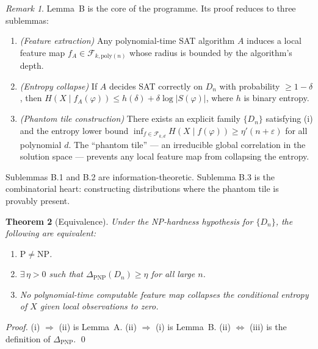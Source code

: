 \documentclass[11pt]{article}
\newtheorem{theorem}{Theorem}[section]
\theoremstyle{definition}
\theoremstyle{remark}
\newtheorem{remark}[theorem]{Remark}
\begin{document}
\begin{remark}
Lemma~B is the core of the programme. Its proof reduces to three sublemmas:
\begin{enumerate}
  \item[\textbf{B.1}] \emph{(Feature extraction)} Any polynomial-time SAT algorithm $A$ induces a local feature map $f_A \in \mathcal{F}_{k, \mathrm{poly}(n)}$ whose radius is bounded by the algorithm's depth.
  \item[\textbf{B.2}] \emph{(Entropy collapse)} If $A$ decides SAT correctly on $D_n$ with probability $\geq 1 - \delta$, then $H(X \mid f_A(\varphi)) \leq h(\delta) + \delta \log |S(\varphi)|$, where $h$ is binary entropy.
  \item[\textbf{B.3}] \emph{(Phantom tile construction)} There exists an explicit family $\{D_n\}$ satisfying (i) and the entropy lower bound $\inf_{f \in \mathcal{F}_{k,d}} H(X \mid f(\varphi)) \geq \eta'(n + \varepsilon)$ for all polynomial $d$. The ``phantom tile'' --- an irreducible global correlation in the solution space --- prevents any local feature map from collapsing the entropy.
\end{enumerate}
Sublemmas B.1 and B.2 are information-theoretic. Sublemma B.3 is the combinatorial heart: constructing distributions where the phantom tile is provably present.
\end{remark}

\begin{theorem}[Equivalence]
\label{thm:pnp-equiv}
Under the NP-hardness hypothesis for $\{D_n\}$, the following are equivalent:
\begin{enumerate}
  \item[(i)] $\mathrm{P} \neq \mathrm{NP}$.
  \item[(ii)] $\exists\, \eta > 0$ such that $\Delta_{\mathrm{PNP}}(D_n) \geq \eta$ for all large $n$.
  \item[(iii)] No polynomial-time computable feature map collapses the conditional entropy of $X$ given local observations to zero.
\end{enumerate}
\end{theorem}

\begin{proof}
(i) $\Rightarrow$ (ii) is Lemma~A. (ii) $\Rightarrow$ (i) is Lemma~B. (ii) $\Leftrightarrow$ (iii) is the definition of $\Delta_{\mathrm{PNP}}$. \qed
\end{proof}

\end{document}
